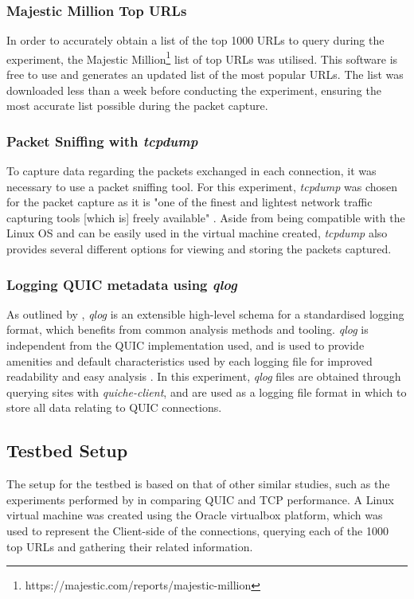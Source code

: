 \documentclass{l4proj}
\begin{document}
\subsubsection{Majestic Million Top URLs} In order to accurately obtain a list of the top 1000 URLs to query during the experiment, the Majestic Million\footnote{https://majestic.com/reports/majestic-million} list of top URLs was utilised. This software is free to use and generates an updated list of the most popular URLs. The list was downloaded less than a week before conducting the experiment, ensuring the most accurate list possible during the packet capture.

\subsubsection{Packet Sniffing with \emph{tcpdump}} To capture data regarding the packets exchanged in each connection, it was necessary to use a packet sniffing tool. For this experiment, \emph{tcpdump} was chosen for the packet capture as it is "one of the finest and lightest network traffic capturing tools [which is] freely available" \citep{Goyal2017}. Aside from being compatible with the Linux OS and can be easily used in the virtual machine created, \emph{tcpdump} also provides several different options for viewing and storing the packets captured.

\subsubsection{Logging QUIC metadata using \emph{qlog}} As outlined by \citet{Marx2024qlog}, \emph{qlog} is an extensible high-level schema for a standardised logging format, which benefits from common analysis methods and tooling. \emph{qlog} is independent from the QUIC implementation used, and is used to provide amenities and default characteristics used by each logging file for improved readability and easy analysis \citep{Marx2024qlog}. In this experiment, \emph{qlog} files are obtained through querying sites with \emph{quiche-client}, and are used as a logging file format in which to store all data relating to QUIC connections.

\subsection{Testbed Setup}

The setup for the testbed is based on that of other similar studies, such as the experiments performed by \citet{Wang2018} in comparing QUIC and TCP performance. A Linux virtual machine was created using the Oracle virtualbox platform, which was used to represent the Client-side of the connections, querying each of the 1000 top URLs and gathering their related information.
\end{document}
